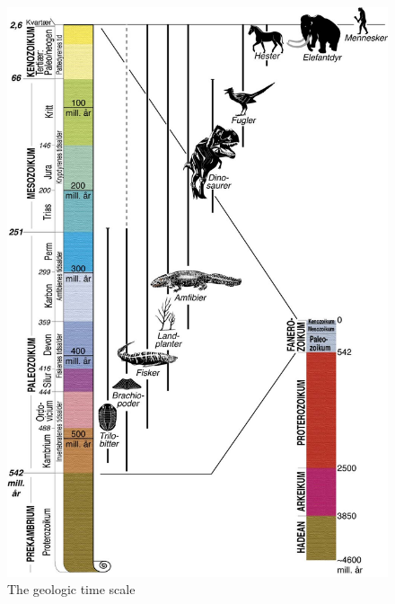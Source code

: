 \documentclass[a4paper,12pt]{report}
\begin{document}
\begin{figure}
 \includegraphics[width=\linewidth]{thesis/geo/geoTime.png}
 \caption{The geologic time scale}
 \label{fig:geoTime}
\end{figure}
\end{document}
